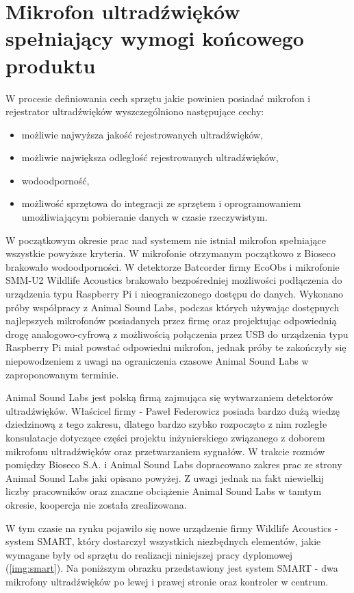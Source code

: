 \documentclass{sprz}
\begin{document}
\section{Mikrofon ultradźwięków spełniający wymogi końcowego produktu}
W procesie definiowania cech sprzętu jakie powinien posiadać mikrofon i rejestrator ultradźwięków wyszczególniono następujące cechy:
  \begin{itemize}
    \item{możliwie najwyższa jakość rejestrowanych ultradźwięków,}
    \item{możliwie największa odległość rejestrowanych ultradźwięków,}
    \item{wodoodporność,}
    \item{możliwość sprzętowa do integracji ze sprzętem i oprogramowaniem umożliwiającym pobieranie danych w czasie rzeczywistym.}
  \end{itemize}

W początkowym okresie prac nad systemem nie istniał mikrofon spełniające wszystkie powyższe kryteria. W mikrofonie otrzymanym początkowo z Bioseco brakowało wodoodporności. W detektorze Batcorder firmy EcoObs i mikrofonie SMM-U2 Wildlife Acoustics brakowało bezpośredniej możliwości podłączenia do urządzenia typu Raspberry Pi i nieograniczonego dostępu do danych. Wykonano próby współpracy z Animal Sound Labs, podczas których używając dostępnych najlepszych mikrofonów posiadanych przez firmę oraz projektując odpowiednią drogę analogowo-cyfrową z możliwością połączenia przez USB do urządzenia typu Raspberry Pi miał powstać odpowiedni mikrofon, jednak próby te zakończyły się niepowodzeniem z uwagi na ograniczenia czasowe Animal Sound Labs w zaproponowanym terminie. 

Animal Sound Labs jest polską firmą zajmująca się wytwarzaniem detektorów ultradźwięków. Właścicel firmy - Paweł Federowicz posiada bardzo dużą wiedzę dziedzinową z tego zakresu, dlatego bardzo szybko rozpoczęto z nim rozległe konsulatacje dotyczące części projektu inżynierskiego związanego z doborem mikrofonu ultradźwięków oraz przetwarzaniem sygnałów. W trakcie rozmów pomiędzy Bioseco S.A. i Animal Sound Labs dopracowano zakres prac ze strony Animal Sound Labs jaki opisano powyżej. Z uwagi jednak na fakt niewielkij liczby pracowników oraz znaczne obciążenie Animal Sound Labs w tamtym okresie, koopercja nie została zrealizowana.

W tym czasie na rynku pojawiło się nowe urządzenie firmy Wildlife Acoustics - system SMART, który dostarczył wszystkich niezbędnych elementów, jakie wymagane były od sprzętu do realizacji niniejszej pracy dyplomowej (\ref{img:smart}). Na poniższym obrazku przedstawiony jest system SMART - dwa mikrofony ultradźwięków po lewej i prawej stronie oraz kontroler w centrum.
\end{document}
